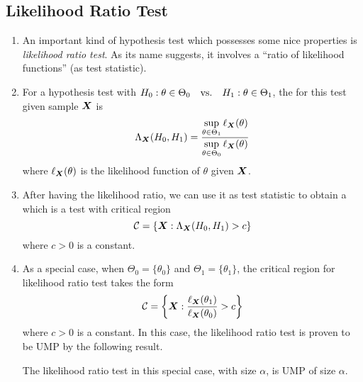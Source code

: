 \subsection{Likelihood Ratio Test}
\begin{enumerate}
\item An important kind of hypothesis test which possesses some nice properties
is \emph{likelihood ratio test}. As its name suggests, it involves a ``ratio
of likelihood functions'' (as test statistic).

\item For a hypothesis test with
\(H_0:\theta\in\Theta_0\qqtext{vs.}H_1:\theta\in\Theta_1\), the
 for this test given sample \(\vb*{X}\) is
\[
\Lambda_{\vb*{X}}(H_0,H_1)=\frac{\displaystyle \sup_{\theta\in\Theta_1}\ell_{\vb*{X}}\qty(\theta)}
{\displaystyle \sup_{\theta\in\Theta_0}\ell_{\vb*{X}}\qty(\theta)}
\]
where \(\ell_{\vb*{X}}\qty(\theta)\) is the likelihood function of \(\theta\) given
\(\vb*{X}\).

\item After having the likelihood ratio, we can use it as test statistic to
obtain a  which is a test with critical region
\[
\mathcal{C}=\{\vb*{X}:\Lambda_{\vb*{X}}(H_0,H_1)>c\}
\]
where \(c>0\) is a constant.

\item As a special case, when \(\Theta_0=\{\theta_0\}\) and
\(\Theta_1=\{\theta_1\}\), the critical region for likelihood ratio test takes
the form
\[
\mathcal{C}=\qty{\vb*{X}:\frac{\ell_{\vb*{X}}\qty(\theta_1)}{\ell_{\vb*{X}}\qty(\theta_0)}>c}
\]
where \(c>0\) is a constant.
In this case, the likelihood ratio test is proven to be UMP by the following
result.
\begin{theorem}
\label{thm:neyman-pearson}
The likelihood ratio test in this special case, with size \(\alpha\), is UMP of
size \(\alpha\).
\end{theorem}
\end{enumerate}
